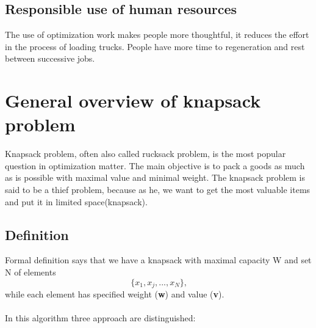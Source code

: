 \documentclass[conference,compsoc]{IEEEtran}
\begin{document}
\subsection{Responsible use of human resources}
The use of optimization work makes people more thoughtful, it reduces the effort in the process of loading trucks. People have more time to regeneration and rest between successive jobs.

\section{General overview of knapsack problem}
Knapsack problem, often also called rucksack problem, is the most popular question in optimization matter. The main objective is to pack a goods as much as is possible with maximal value and minimal weight. The knapsack problem is said to be a thief problem, because as he, we want to get the most valuable items and put it in limited space(knapsack).

\subsection{Definition}
Formal definition says that we have a knapsack with maximal capacity W and set N of elements 
$$ \{x_1,x_j,...,x_N\} \textrm{,}$$
while each element has specified weight (\textbf{w}) and value (\textbf{v}).\\\\
 
In this algorithm three approach are distinguished:
\end{document}

